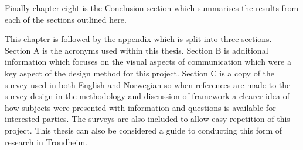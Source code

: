 Finally chapter eight is the Conclusion section which summarises the results from each of the sections outlined here.

This chapter is followed by the appendix which is split into three sections. Section A is the acronyms used within this thesis. Section B is additional information which focuses on the visual aspects of communication which were a key aspect of the design method for this project. Section C is a copy of the survey used in both English and Norwegian so when references are made to the survey design in the methodology and  discussion of framework a clearer idea of how subjects were presented with information and questions is available for interested parties. The surveys are also included to allow easy repetition of this project. This thesis can also be considered a guide to conducting this form of research in Trondheim. 
